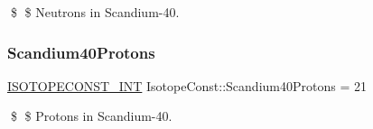 \$ \$ Neutrons in Scandium-\/40. \mbox{\label{group___isotope_const-_scandium-_sc40_ga12fba7a371774145c959f03ad496cc22}} 
\subsubsection{\texorpdfstring{Scandium40\+Protons}{Scandium40Protons}}
{\footnotesize\ttfamily \mbox{\hyperlink{group___isotope_const-_macros_ga5f18360b3e99483a35c32d789e62621c}{I\+S\+O\+T\+O\+P\+E\+C\+O\+N\+S\+T\+\_\+\+I\+NT}} Isotope\+Const\+::\+Scandium40\+Protons = 21}

\$ \$ Protons in Scandium-\/40. 